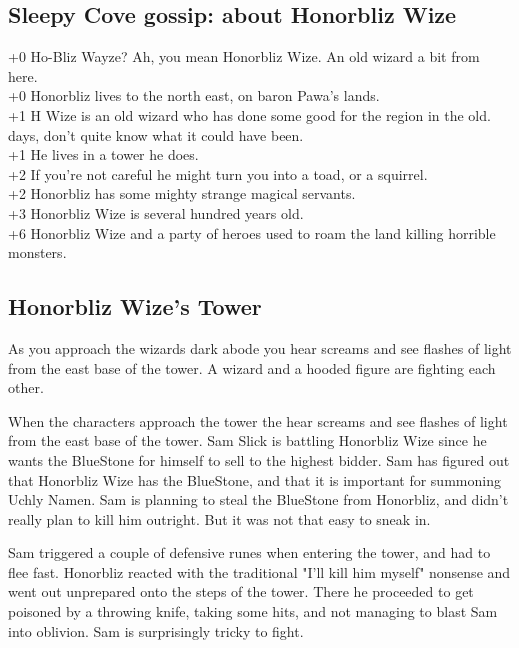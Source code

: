 \subsection*{Sleepy Cove gossip: about Honorbliz Wize}
+0 Ho-Bliz Wayze? Ah, you mean Honorbliz Wize. An old wizard a bit from here. \\
+0 Honorbliz lives to the north east, on baron Pawa's lands. \\
+1 H Wize is an old wizard who has done some good for the region in the old. \\ days, don't quite know what it could have been. \\
+1 He lives in a tower he does. \\
+2 If you're not careful he might turn you into a toad, or a squirrel. \\
+2 Honorbliz has some mighty strange magical servants. \\
+3 Honorbliz Wize is several hundred years old. \\
+6 Honorbliz Wize and a party of heroes used to roam the land killing horrible monsters. \\


\subsection*{Honorbliz Wize's Tower}
\begin{readoutloud}
As you approach the wizards dark abode you hear screams and see flashes of light from the east base of the tower. A wizard and a hooded figure are fighting each other.
\end{readoutloud}

When the characters approach the tower the hear screams and see flashes of light from the east base of the tower. Sam Slick is battling Honorbliz Wize since he wants the BlueStone for himself to sell to the highest bidder. Sam has figured out that Honorbliz Wize has the BlueStone, and that it is important for summoning Uchly Namen. Sam is planning to steal the BlueStone from Honorbliz, and didn't really plan to kill him outright. But it was not that easy to sneak in.

Sam triggered a couple of defensive runes when entering the tower, and had to flee fast. Honorbliz reacted with the traditional "I'll kill him myself" nonsense and went out unprepared onto the steps of the tower. There he proceeded to get poisoned by a throwing knife, taking some hits, and not managing to blast Sam into oblivion. Sam is surprisingly tricky to fight.

